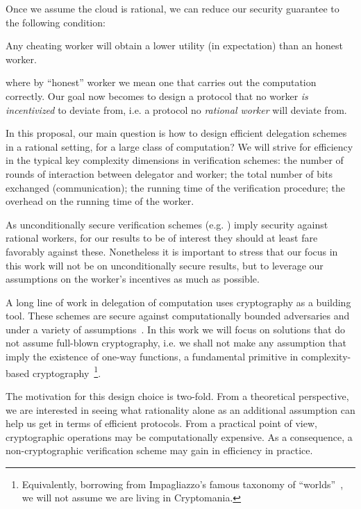Once we assume the cloud is rational, we can reduce our security guarantee to the following condition:
\begin{displayquote}
	Any cheating worker will obtain a lower utility (in expectation) than an honest worker.
\end{displayquote}
 where by ``honest'' worker we mean one that carries out the computation correctly.
Our goal now becomes to design a protocol that no worker \textit{is incentivized} to deviate from, i.e. a protocol no \textit{rational worker} will deviate from. 


In this proposal, our main question is how to design efficient delegation schemes in a rational setting, for a large class of computation? We will strive for efficiency in the typical key complexity dimensions in  verification schemes: the number of rounds of interaction between delegator and worker; the total number of bits exchanged (communication); the running time of the verification procedure; the overhead on the running time of the worker.

As unconditionally secure verification schemes (e.g. \cite{muggles,rrr16})  %
imply security against rational workers, for our results to be of interest they should at least fare favorably against these.
Nonetheless it is important to stress that our focus in this work will not be on unconditionally secure results, but to leverage our assumptions on the worker's incentives as much as possible. 

A long line of work in delegation of computation uses cryptography as a building tool. These schemes are secure against computationally bounded adversaries and under a variety of assumptions~\cite{ggp10,ckv10,qap,pinocchio,kalai2014delegate}.
In this work we will focus on solutions that do not assume full-blown cryptography, i.e. we shall not make any assumption that imply the existence of one-way functions, a fundamental primitive in complexity-based cryptography~\cite{impagliazzo1989one}\footnote{Equivalently, borrowing from  Impagliazzo's famous taxonomy of ``worlds''~\cite{impagliazzo1995personal}, we will not assume we are living in Cryptomania.}.

The motivation for this design choice is two-fold. From a theoretical perspective, we are interested in seeing what rationality alone as an additional assumption can help us get in terms of efficient protocols. From a practical point of view, cryptographic operations may be computationally expensive. As a consequence, a non-cryptographic verification scheme may gain in efficiency in practice.

